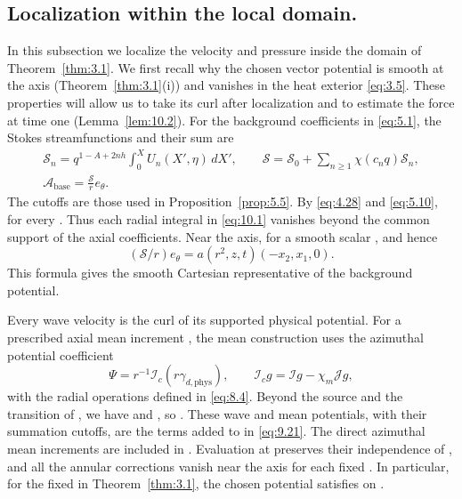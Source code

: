 \subsection{Localization within the local domain.}\label{sec:10.1}
In this subsection we localize the velocity and pressure inside the domain of
Theorem~\ref{thm:3.1}. We first recall why the chosen vector potential
 is smooth at the axis (Theorem~\ref{thm:3.1}\textup{(i)}) and
vanishes in the heat exterior \eqref{eq:3.5}. These properties will allow us to take its curl after
localization and to estimate the force at time one (Lemma~\ref{lem:10.2}). For the background
coefficients  in \eqref{eq:5.1}, the Stokes streamfunctions and their sum
are
\begin{equation}
\begin{gathered}
\mathcal S_n=q^{1-A+2nh}\int_0^XU_n(X',\eta)\,dX',
\qquad \mathcal S=\mathcal S_0+\sum_{n\geq1}\chi(c_nq)\mathcal S_n,\\
\mathcal A_{\mathrm{base}}=\frac{\mathcal S}r e_\theta.
\end{gathered}
\tag{10.1}\label{eq:10.1}
\end{equation}
The cutoffs  are those used in
Proposition~\ref{prop:5.5}. By \eqref{eq:4.28} and \eqref{eq:5.10},
 for every
. Thus each radial integral in \eqref{eq:10.1} vanishes beyond the
common support of the axial coefficients. Near the axis,
 for a smooth scalar , and hence
\[
(\mathcal S/r)e_\theta=a(r^2,z,t)(-x_2,x_1,0).
\]
This formula gives the smooth Cartesian representative of the background potential.

Every wave velocity is the curl of its supported physical potential. For a prescribed axial mean
increment , the mean construction uses the azimuthal
potential coefficient
\[
\Psi=r^{-1}\mathcal I_c(r\gamma_{d,\mathrm{phys}}),
\qquad \mathcal I_cg=\mathcal Ig-\chi_m\mathcal Jg,
\]
with the radial operations defined in \eqref{eq:8.4}. Beyond the source and the transition of
, we have  and
, so . These wave and
mean potentials, with their summation cutoffs, are the terms added to
 in \eqref{eq:9.21}. The direct azimuthal mean
increments are included in . Evaluation at
 preserves their independence of , and
all the annular corrections vanish near the axis for each fixed . In
particular, for the fixed  in
Theorem~\ref{thm:3.1}, the chosen potential satisfies
 on .

